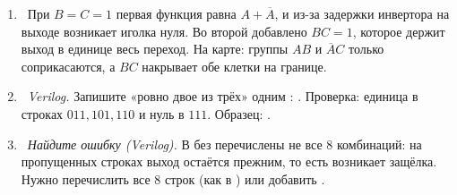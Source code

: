 \begin{enumerate}
  \item {}~При $B=C=1$ первая функция равна $A+\overline{A}$, и из-за задержки инвертора на выходе возникает иголка нуля. Во второй добавлено $BC=1$, которое держит выход в единице весь переход. На карте: группы $AB$ и $\overline{A}C$ только соприкасаются, а $BC$ накрывает обе клетки на границе.
  \item {}~\emph{Verilog.} Запишите «ровно двое из трёх» одним : . Проверка: единица в строках $011,101,110$ и нуль в $111$. Образец: .
  \item {}~\emph{Найдите ошибку (Verilog).} В  без  перечислены не все 8 комбинаций: на пропущенных строках выход остаётся прежним, то есть возникает защёлка. Нужно перечислить все 8 строк (как в ) или добавить .
\end{enumerate}

